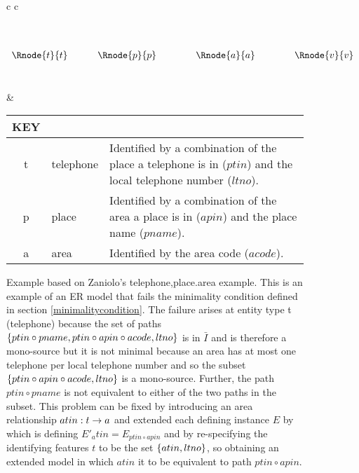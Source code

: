 \begin{figure} [h]
\begin{center}
\begin{tabular}{c c}
$
\begin{array}{cp{0.4cm}cp{0.75cm}cp{0.75cm}c}
              &&               &&                &&               \\[0.25cm]
              &&               &&                &&               \\[0.25cm]
\Rnode{t}{t}	&& \Rnode{p}{p}  &&   \Rnode{a}{a} && \Rnode{v}{v}  \\[0.25cm]
	            &&  
\end{array}
$

\idcomp
{}
\idcomp
{}
\idcomp
{}
\idcomp
{}
\idcomp
& \footnotesize
\begin{tabular}{c p{1.5cm} p{4cm}}
KEY && \\
\hline
t  & telephone       & Identified by a combination of the place a telephone is in ($ptin$) 
                      and the local telephone number ($ltno$). \\
p  & place           & Identified by a combination of the area a place is in ($apin$)
                         and the place name ($pname$). \\
a  & area            & Identified by the area code ($acode$).
\end{tabular} 
\end{tabular}
\end{center}
\caption{Example based on Zaniolo's telephone,place.area example. 
This is an example of an ER model that fails the minimality condition defined in section \ref{minimalitycondition}.
The failure arises at entity type t (telephone) because 
the set of paths $\left\{ptin\circ pname, ptin \circ apin \circ acode, ltno\right\}$ is
in $\bar{I}$ and is therefore a mono-source but it is not minimal because
 an area has at most one telephone per local telephone number and so the 
subset $\left\{ptin \circ apin \circ acode, ltno\right\}$ is  a
mono-source. Further, the path $ptin \circ pname$ is not equivalent to either of the two paths in the subset.
This problem can be fixed by introducing an area relationship $atin: t \rightarrow a$ and extended each defining instance $E$
 by which is defining $E'_atin=E_{ptin \circ apin}$  and by re-specifying the identifying features $t$ to be the set $\left\{atin,ltno\right\}$,
so obtaining an extended model in which $atin$ it to be equivalent to
path $ptin \circ apin$.
}
\label{clubpresidentbeforenormalisation}
\end{figure}